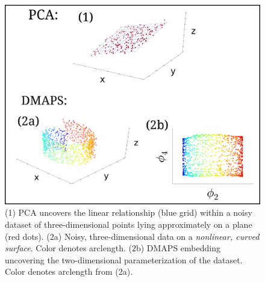 \documentclass[11pt]{article}
\begin{document}
\begin{figure}[!h]
  \begin{center}
    \includegraphics[width=\textwidth]{dim_red}
    \caption{(1) PCA uncovers the linear relationship (blue grid) within a noisy dataset of three-dimensional points lying approximately on a plane (red dots). (2a) Noisy, three-dimensional data on a \textit{nonlinear, curved surface}. Color denotes arclength. (2b) DMAPS embedding uncovering the two-dimensional parameterization of the dataset. Color denotes arclength from (2a).}
    \label{fig:dim_red}
  \end{center}
\end{figure}
\end{document}
